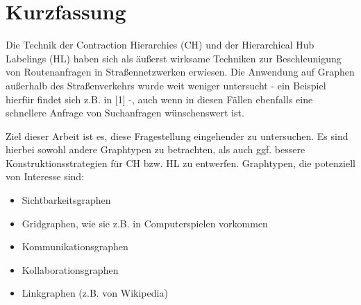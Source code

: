 \chapter*{Kurzfassung}
Die Technik der Contraction Hierarchies (CH) und der Hierarchical Hub Labelings (HL) haben sich als äußerst wirksame Techniken zur Beschleunigung von Routenanfragen in Straßennetzwerken erwiesen. Die Anwendung auf Graphen außerhalb des Straßenverkehrs wurde weit weniger untersucht - ein Beispiel hierfür findet sich z.B. in [1] -, auch wenn in diesen Fällen ebenfalls eine schnellere Anfrage von Suchanfragen wünschenswert ist.

Ziel dieser Arbeit ist es, diese Fragestellung eingehender zu untersuchen. Es sind hierbei sowohl andere Graphtypen zu betrachten, als auch ggf. bessere Konstruktionsstrategien für CH bzw. HL zu entwerfen. Graphtypen, die potenziell von Interesse sind:

\begin{itemize}
      \item
            Sichtbarkeitsgraphen
      \item
            Gridgraphen, wie sie z.B. in Computerspielen vorkommen
      \item
            Kommunikationsgraphen
      \item
            Kollaborationsgraphen
      \item
            Linkgraphen (z.B. von Wikipedia)
\end{itemize}